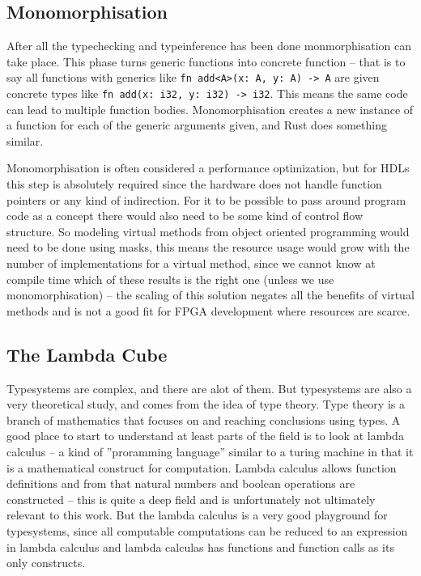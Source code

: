 \subsection{Monomorphisation}
\label{sec:Monomorphisation}
After all the typechecking and typeinference has been done monmorphisation can take place. This phase turns generic functions into concrete function -- that is to say all functions with generics like \verb+fn add<A>(x: A, y: A) -> A+ are given concrete types like \verb+fn add(x: i32, y: i32) -> i32+. This means the same code can lead to multiple function bodies. Monomorphisation creates a new instance of a function for each of the generic arguments given, and Rust does something similar. \cite{src:rustMono}

Monomorphisation is often considered a performance optimization, but for HDLs this step is absolutely required since the hardware does not handle function pointers or any kind of indirection. For it to be possible to pass around program code as a concept there would also need to be some kind of control flow structure. So modeling virtual methods from object oriented programming would need to be done using masks, this means the resource usage would grow with the number of implementations for a virtual method, since we cannot know at compile time which of these results is the right one (unless we use monomorphisation) -- the scaling of this solution negates all the benefits of virtual methods and is not a good fit for FPGA development where resources are scarce. 

\subsection{The Lambda Cube}
\label{sec:lambdaCube}
Typesystems are complex, and there are alot of them. But typesystems are also a very theoretical study, and comes from the idea of type theory. Type theory is a branch of mathematics that focuses on and reaching conclusions using types. A good place to start to understand at least parts of the field is to look at lambda calculus -- a kind of ''proramming language'' similar to a turing machine in that it is a mathematical construct for computation. Lambda calculus allows function definitions and from that natural numbers and boolean operations are constructed -- this is quite a deep field and is unfortunately not ultimately relevant to this work. But the lambda calculus is a very good playground for typesystems, since all computable computations can be reduced to an expression in lambda calculus and lambda calculas has functions and function calls as its only constructs.

